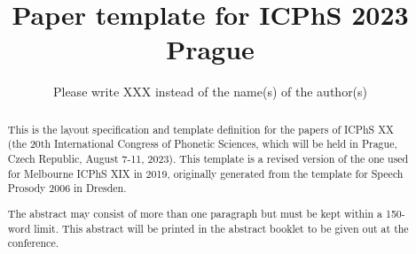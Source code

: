 \title{Paper template for {ICPhS} 2023 Prague}
\author{Please write XXX instead of the name(s) of the author(s)}


\maketitle

\begin{abstract}
This is the layout specification and template definition for the papers of ICPhS XX (the 20th International Congress of Phonetic Sciences, which will be held in Prague, Czech Republic, August 7-11, 2023). 
This template is a revised version of the one used for Melbourne ICPhS XIX in 2019, originally generated from the template for Speech Prosody 2006 in Dresden.

The abstract may consist of more than one paragraph but must be kept within a 150-word limit. 
This abstract will be printed in the abstract booklet to be given out at the conference.
\end{abstract}


